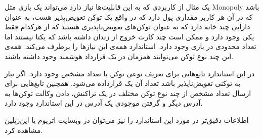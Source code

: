 یک مثال از کاربردی که به این قابلیت‌ها نیاز دارد می‌تواند یک بازی مثل
\gls{Monopoly}
باشد
که در آن هر کاربر مقداری پول دارد که در واقع یک توکن تعویض‌پذیر هست،
به عنوان دارایی چند خانه دارد که به عنوان توکن‌های تعویض‌ناپذیری هستند که از هرکدام فقط یکی وجود دارد
و ممکن است چند کارت خروج از زندان داشته باشد که یکتا نیستند اما تعداد محدودی در بازی وجود دارد. استاندارد
همه‌ی این نیازها را برطرف می‌کند. همه‌ی این چند نوع توکن می‌توانند همزمان در یک قرارداد هوشمند وجود داشته باشند.

در این استاندارد تابع‌هایی برای تعریف نوعی توکن با تعداد مشخص وجود دارد.
اگر نیاز به توکنی تعویض‌ناپذیر باشد تعداد آن یک قرارداده می‌شود.
همچنین تابع‌هایی برای ارسال تعداد مشخص از چند نوع توکن مختلف در یک تراکنش،
دادن وکالت توکن‌ها به آدرس دیگر و گرفتن موجودی یک آدرس در این استاندارد وجود دارد.

اطلاعات دقیق‌تر در مورد این استاندارد را نیز می‌توان در وبسایت
اتریوم
یا
اپن‌زپلین
مشاهده کرد.
